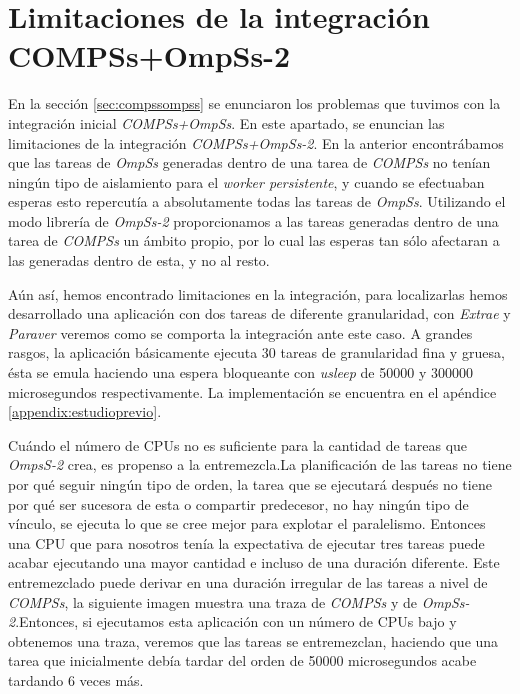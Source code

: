 \chapter{Limitaciones de la integración COMPSs+OmpSs-2}
\label{sec:estudiopreviorend}

En la sección \ref{sec:compssompss} se enunciaron los problemas que tuvimos con la integración inicial \textit{COMPSs+OmpSs}. En este apartado, se enuncian las limitaciones de la integración \textit{COMPSs+OmpSs-2}. En la anterior encontrábamos que las tareas de \textit{OmpSs} generadas dentro de una tarea de \textit{COMPSs} no tenían ningún tipo de aislamiento para el \textit{worker persistente}, y cuando se efectuaban esperas esto repercutía a absolutamente todas las tareas de \textit{OmpSs}. Utilizando el modo librería de \textit{OmpSs-2} proporcionamos a las tareas generadas dentro de una tarea de \textit{COMPSs} un ámbito propio, por lo cual las esperas tan sólo afectaran a las generadas dentro de esta, y no al resto.

\par\bigskip

Aún así, hemos encontrado limitaciones en la integración, para localizarlas hemos desarrollado una aplicación con dos tareas de diferente granularidad, con \textit{Extrae} y \textit{Paraver} veremos como se comporta la integración ante este caso. A grandes rasgos, la aplicación básicamente ejecuta 30 tareas de granularidad fina y gruesa, ésta se emula haciendo una espera bloqueante con \textit{usleep} de 50000 y 300000 microsegundos respectivamente. La implementación se encuentra en el apéndice \ref{appendix:estudioprevio}.

\par\bigskip

Cuándo el número de CPUs no es suficiente para la cantidad de tareas que \textit{OmpsS-2} crea, es propenso a la entremezcla.La planificación de las tareas no tiene por qué seguir ningún tipo de orden, la tarea que se ejecutará después no tiene por qué ser sucesora de esta o compartir predecesor, no hay ningún tipo de vínculo, se ejecuta lo que se cree mejor para explotar el paralelismo. Entonces una CPU que para nosotros tenía la expectativa de ejecutar tres tareas puede acabar ejecutando una mayor cantidad e incluso de una duración diferente. Este entremezclado puede derivar en una duración irregular de las tareas a nivel de \textit{COMPSs}, la siguiente imagen muestra una traza de \textit{COMPSs} y de \textit{OmpSs-2}.Entonces, si ejecutamos esta aplicación con un número de CPUs bajo y obtenemos una traza, veremos que las tareas se entremezclan, haciendo que una tarea que inicialmente debía tardar del orden de 50000 microsegundos acabe tardando 6 veces más. 

